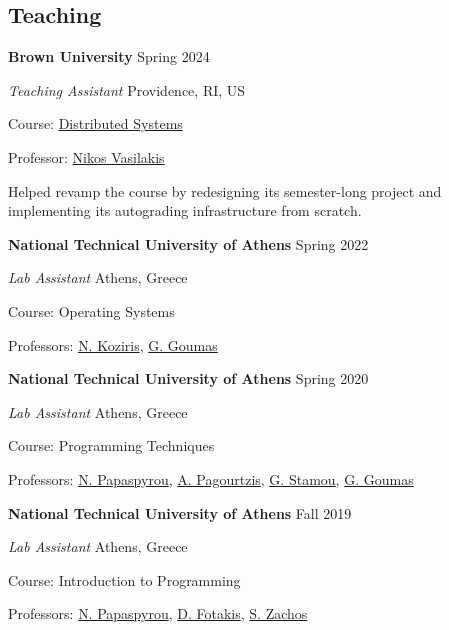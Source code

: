 \documentclass[margin,12pt]{resume}
\newcommand{\descriptionVSpace}{\vspace{0.5ex}\xspace}
\newcommand{\subsectionVSpace}{\vspace{3.5ex}\xspace}
\newcommand{\sectionVSpace}{\vspace{1ex}\xspace} %
\newcommand{\sectionVSpaceCorrection}{\vspace{-3.5ex}} %
\newcommand{\header}[1]{\textbf{#1}\xspace}
\newcommand{\institution}[1]{\header{#1}\xspace}
\newcommand{\place}[1]{#1\xspace}
\newcommand{\role}[1]{\textit{#1}\xspace}
\newcommand{\singleDate}[1]{#1\xspace}
\newcommand{\stitle}[1]{#1:\xspace}
\newenvironment{rSubsection}{}{\par\subsectionVSpace}
\newenvironment{rSection}[1]{\sectionVSpaceCorrection\section{#1}\xspace}{\sectionVSpace\par}
\newenvironment{jobDuties}{\descriptionVSpace}{\par}
\begin{document}
\begin{resume}
\begin{rSection}{Teaching}
		\begin{rSubsection}
			\institution{Brown University} \hfill \singleDate{Spring 2024}

			\role{Teaching Assistant} \hfill \place{Providence, RI, US}

			\stitle{Course} \href{https://cs.brown.edu/courses/csci1380/s24/}{Distributed Systems}

			\stitle{Professor} \href{https://nikos.vasilak.is}{Nikos Vasilakis}

			\begin{jobDuties}
				Helped revamp the course by redesigning its semester-long project and implementing its autograding infrastructure from scratch.
			\end{jobDuties}
		\end{rSubsection}

		\begin{rSubsection}
			\institution{National Technical University of Athens} \hfill \singleDate{Spring 2022}

			\role{Lab Assistant} \hfill \place{Athens, Greece}

			\stitle{Course} Operating Systems

			\stitle{Professors} \href{http://www.cslab.ntua.gr/~nkoziris/}{N. Koziris}, \href{http://www.cslab.ntua.gr/~goumas/}{G. Goumas}
		\end{rSubsection}

		\begin{rSubsection}
			\institution{National Technical University of Athens} \hfill \singleDate{Spring 2020}

			\role{Lab Assistant} \hfill \place{Athens, Greece}

			\stitle{Course} Programming Techniques

			\stitle{Professors} \href{http://www.softlab.ntua.gr/~nickie/}{N. Papaspyrou}, \href{http://users.softlab.ntua.gr/~pagour/}{A. Pagourtzis}, \href{http://www.image.ntua.gr/~gstam/}{G. Stamou}, \href{http://www.cslab.ntua.gr/~goumas/}{G. Goumas}
		\end{rSubsection}

		\begin{rSubsection}
			\institution{National Technical University of Athens} \hfill \singleDate{Fall 2019}

			\role{Lab Assistant} \hfill \place{Athens, Greece}

			\stitle{Course} Introduction to Programming

			\stitle{Professors} \href{http://www.softlab.ntua.gr/~nickie/}{N. Papaspyrou}, \href{http://www.softlab.ntua.gr/~fotakis/}{D. Fotakis}, \href{https://en.wikipedia.org/wiki/Stathis_Zachos}{S. Zachos}
		\end{rSubsection}
	\end{rSection}


\end{resume}
\end{document}
